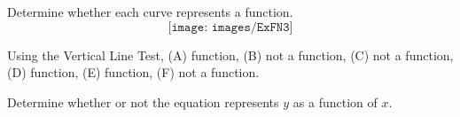 \begin{enumialphparenastyle}

\begin{multicols}{2}
\begin{ex}
Determine whether each curve represents a function. \\

\vspace{-1.3cm}
$$\texttt{[image: images/ExFN3]}$$	

\begin{sol}
	Using the Vertical Line Test,
	(A) function, \hspace{3mm} (B) not a function, \hspace{3mm} (C) not a function, \hspace{3mm} (D) function, \hspace{3mm} (E) function, \hspace{3mm} (F) not a function. 	
\end{sol}
\end{ex}

\begin{ex}
Determine whether or not the equation represents $y$ as a function of $x$.\\


\end{ex}
\end{multicols}
\end{enumialphparenastyle}
